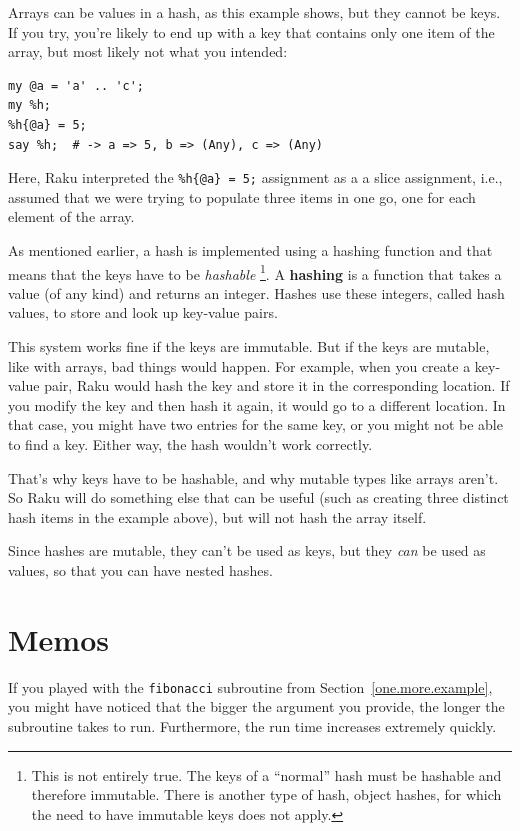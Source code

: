 Arrays can be values in a hash, as this example shows, but they
cannot be keys.  If you try, you're likely to end up with a 
key that contains only one item of the array, but most likely 
not what you intended:

\begin{verbatim}
my @a = 'a' .. 'c';
my %h;
%h{@a} = 5;
say %h;  # -> a => 5, b => (Any), c => (Any)
\end{verbatim}

Here, Raku interpreted the \verb'%h{@a} = 5;' assignment 
as a a slice assignment, i.e., assumed that we were 
trying to populate three items in one go, one for each 
element of the array.

As mentioned earlier, a hash is implemented using
a hashing function and that means that the keys have to 
be \emph{hashable} \footnote{This is not entirely true. The 
keys of a ``normal'' hash must be hashable and therefore 
immutable. There is another type of hash, object hashes, 
for which the need to have immutable keys does not apply.}. 
A {\bf hashing} is a function that takes 
a value (of any kind) and returns an integer.  Hashes use 
these integers, called hash values, to store and look up 
key-value pairs.

This system works fine if the keys are immutable.  But if the
keys are mutable, like with arrays, bad things would happen. For example,
when you create a key-value pair, Raku would hash the key and 
store it in the corresponding location.  If you modify the
key and then hash it again, it would go to a different location.
In that case, you might have two entries for the same key,
or you might not be able to find a key.  Either way, the
hash wouldn't work correctly.

That's why keys have to be hashable, and why mutable types like
arrays aren't. So Raku will do something else that can be 
useful (such as creating three distinct hash items in the 
example above), but will not hash the array itself.

Since hashes are mutable, they can't be used as keys,
but they {\em can} be used as values, so that you can 
have nested hashes.

\section{Memos}
\label{memoize}

If you played with the {\tt fibonacci} subroutine from
Section~\ref{one.more.example}, you might have noticed that 
the bigger the argument you provide, the longer the 
subroutine takes to run. Furthermore, the run time 
increases extremely quickly.


